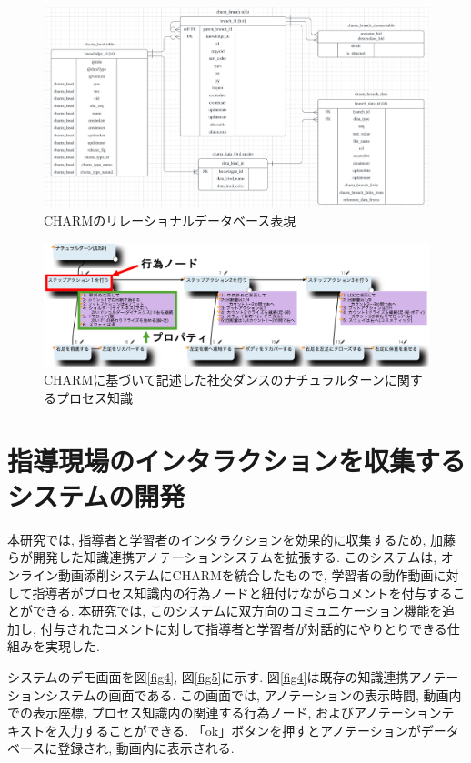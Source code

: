 \begin{figure}[htbp]
    \centering
    \includegraphics[width=1.0\linewidth]{./image/charm_database.png}
    \caption{CHARMのリレーショナルデータベース表現}
    \label{fig2}
\end{figure}

\begin{figure}[htbp]
    \centering
    \includegraphics[width=1.0\linewidth]{./image/charm_natural_turn.png}
    \caption{CHARMに基づいて記述した社交ダンスのナチュラルターンに関するプロセス知識}
    \label{fig3}
\end{figure}



\section{指導現場のインタラクションを収集するシステムの開発}
本研究では, 指導者と学習者のインタラクションを効果的に収集するため, 加藤らが開発した知識連携アノテーションシステム\cite{Kato2023}を拡張する. このシステムは, オンライン動画添削システムにCHARMを統合したもので, 学習者の動作動画に対して指導者がプロセス知識内の行為ノードと紐付けながらコメントを付与することができる. 本研究では, このシステムに双方向のコミュニケーション機能を追加し, 付与されたコメントに対して指導者と学習者が対話的にやりとりできる仕組みを実現した. 

システムのデモ画面を図\ref{fig4}, 図\ref{fig5}に示す. 図\ref{fig4}は既存の知識連携アノテーションシステムの画面である. この画面では, アノテーションの表示時間, 動画内での表示座標, プロセス知識内の関連する行為ノード, およびアノテーションテキストを入力することができる. 「ok」ボタンを押すとアノテーションがデータベースに登録され, 動画内に表示される.

